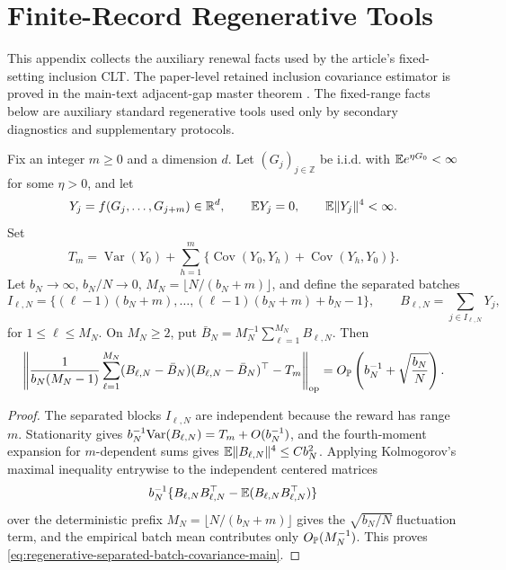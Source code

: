 \section{Finite-Record Regenerative Tools}\label{app:finite-record-regenerative-tools-main}

This appendix collects the auxiliary renewal facts used by the article's
fixed-setting inclusion CLT.
The paper-level retained inclusion covariance estimator is proved in the
main-text adjacent-gap master theorem
.  The fixed-range
facts below are auxiliary standard regenerative tools used only by secondary
diagnostics and supplementary protocols.

\begin{proposition}\label{thm:regenerative-separated-batch-covariance-main}
Fix an integer \(m\ge0\) and a dimension \(d\).  Let
\((G_j)_{j\in\mathbb Z}\) be i.i.d. with
\(\mathbb E e^{\eta G_0}<\infty\) for some \(\eta>0\), and let
\[
Y_j=f(G_j,\ldots,G_{j+m})\in\mathbb R^d,\qquad
\mathbb E Y_j=0,\qquad \mathbb E\|Y_j\|^4<\infty .
\]
Set
\[
T_m=\operatorname{Var}(Y_0)+
\sum_{h=1}^m\{\operatorname{Cov}(Y_0,Y_h)+\operatorname{Cov}(Y_h,Y_0)\}.
\]
Let \(b_N\to\infty\), \(b_N/N\to0\),
\(M_N=\lfloor N/(b_N+m)\rfloor\), and define the separated batches
\[
I_{\ell,N}=\{(\ell-1)(b_N+m),\ldots,
(\ell-1)(b_N+m)+b_N-1\},\qquad
B_{\ell,N}=\sum_{j\in I_{\ell,N}}Y_j ,
\]
for \(1\le\ell\le M_N\).  On \(M_N\ge2\), put
\(\bar B_N=M_N^{-1}\sum_{\ell=1}^{M_N}B_{\ell,N}\).  Then
\begin{equation}\label{eq:regenerative-separated-batch-covariance-main}
\left\|
\frac{1}{b_N(M_N-1)}
\sum_{\ell=1}^{M_N}(B_{\ell,N}-\bar B_N)
(B_{\ell,N}-\bar B_N)^\top
-T_m
\right\|_{\operatorname{op}}
=O_{\mathbb P}\left(b_N^{-1}+\sqrt{\frac{b_N}{N}}\right).
\end{equation}
\end{proposition}

\begin{proof}
The separated blocks \(I_{\ell,N}\) are independent because the reward has
range \(m\).  Stationarity gives
\(b_N^{-1}\mathrm{Var}(B_{\ell,N})=T_m+O(b_N^{-1})\), and the fourth-moment expansion
for \(m\)-dependent sums gives \(\mathbb E\|B_{\ell,N}\|^4\le Cb_N^2\).  Applying
Kolmogorov's maximal inequality entrywise to the independent centered matrices
\[
b_N^{-1}\{B_{\ell,N}B_{\ell,N}^\top-\mathbb E(B_{\ell,N}B_{\ell,N}^\top)\}
\]
over the deterministic prefix \(M_N=\lfloor N/(b_N+m)\rfloor\) gives the
\(\sqrt{b_N/N}\) fluctuation term, and the empirical batch mean contributes
only \(O_{\mathbb P}(M_N^{-1})\).  This proves
\eqref{eq:regenerative-separated-batch-covariance-main}.
\end{proof}

